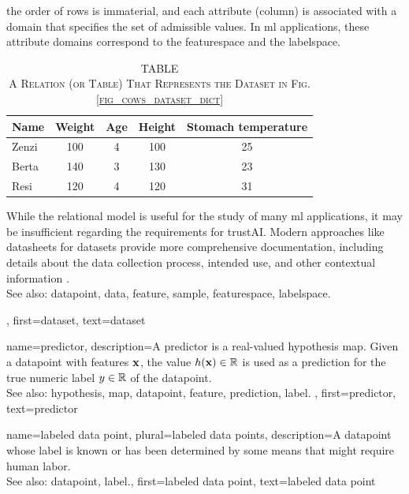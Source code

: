 {{		the order of rows is immaterial, and each attribute (column) is associated with a 
		domain that specifies the set of admissible values. In \gls{ml} applications, 
		these attribute domains correspond to the \gls{featurespace} and the \gls{labelspace}.
		\begin{table}[H]
			\caption*{
				\centering 
				\scshape TABLE \thetable \\[0.5ex]
				\scshape A Relation (or Table) That Represents the Dataset in Fig. \ref{fig_cows_dataset_dict} 
			}
			\label{tab:cowdata_dict} 
			\centering
			\begin{tabular}{lcccc}
				\hline
				\textbf{Name} & \textbf{Weight} & \textbf{Age} & \textbf{Height} & \textbf{Stomach temperature} \\
				\hline
				Zenzi & 100 & 4 & 100 & 25 \\
				Berta & 140 & 3 & 130 & 23 \\
				Resi  & 120 & 4 & 120 & 31 \\
				\hline
			\end{tabular}
		\end{table}
 		While the relational \gls{model} is useful for the study of many \gls{ml} applications, 
		it may be insufficient regarding the requirements for \gls{trustAI}. Modern 
 		approaches like datasheets for datasets provide more comprehensive 
 		documentation, including details about the \gls{data} collection process, intended 
 		use, and other contextual information \cite{DatasheetData2021}.
 		\\
		See also: \gls{datapoint}, \gls{data}, \gls{feature}, \gls{sample}, \gls{featurespace}, \gls{labelspace}.},
	first={dataset},
	text={dataset}  
}

{name={predictor},
	description={A predictor is a real-valued \gls{hypothesis} \gls{map}. 
		Given a \gls{datapoint} with \glspl{feature} ${\bf x}$, the value 
		$h({\bf x}) \in \mathbb{R}$ is used as a \gls{prediction} for the true 
		numeric \gls{label} $y \in \mathbb{R}$ of the \gls{datapoint}.
				\\
		See also: \gls{hypothesis}, \gls{map}, \gls{datapoint}, \gls{feature}, \gls{prediction}, \gls{label}. },
	first={predictor},
	text={predictor}  
}

{name={labeled data point}, plural={labeled data points},
 	description={A \gls{datapoint} whose \gls{label} is known or has been determined 
 		by some means that might require human labor.
			\\
		See also: \gls{datapoint}, \gls{label}.},
 	first={labeled data point},
 	text={labeled data point}  
}

